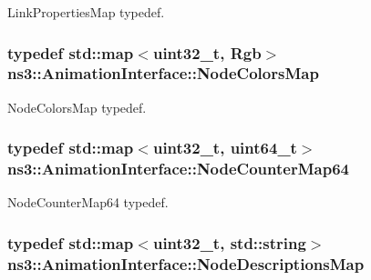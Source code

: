 Link\+Properties\+Map typedef. 

\subsubsection[{\texorpdfstring{Node\+Colors\+Map}{NodeColorsMap}}]{\setlength{\rightskip}{0pt plus 5cm}typedef std\+::map$<$uint32\+\_\+t, {\bf Rgb}$>$ {\bf ns3\+::\+Animation\+Interface\+::\+Node\+Colors\+Map}\hspace{0.3cm}{\ttfamily [private]}}\hypertarget{classns3_1_1AnimationInterface_a1aa744d7fb287937039e55371802f8ce}{}\label{classns3_1_1AnimationInterface_a1aa744d7fb287937039e55371802f8ce}


Node\+Colors\+Map typedef. 

\subsubsection[{\texorpdfstring{Node\+Counter\+Map64}{NodeCounterMap64}}]{\setlength{\rightskip}{0pt plus 5cm}typedef std\+::map$<$uint32\+\_\+t, uint64\+\_\+t$>$ {\bf ns3\+::\+Animation\+Interface\+::\+Node\+Counter\+Map64}\hspace{0.3cm}{\ttfamily [private]}}\hypertarget{classns3_1_1AnimationInterface_a8bd3daf0ee1a2bbebced596061bd012b}{}\label{classns3_1_1AnimationInterface_a8bd3daf0ee1a2bbebced596061bd012b}


Node\+Counter\+Map64 typedef. 

\subsubsection[{\texorpdfstring{Node\+Descriptions\+Map}{NodeDescriptionsMap}}]{\setlength{\rightskip}{0pt plus 5cm}typedef std\+::map$<$uint32\+\_\+t, std\+::string$>$ {\bf ns3\+::\+Animation\+Interface\+::\+Node\+Descriptions\+Map}\hspace{0.3cm}{\ttfamily [private]}}\hypertarget{classns3_1_1AnimationInterface_a493cca9d5a60ca9be9ffd26c57f94d34}{}\label{classns3_1_1AnimationInterface_a493cca9d5a60ca9be9ffd26c57f94d34}


